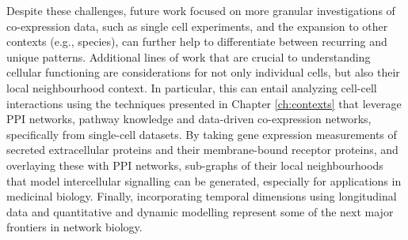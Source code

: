 Despite these challenges, future work focused on more granular investigations of co-expression data, such as single cell experiments, and the expansion to other contexts (e.g., species), can further help to differentiate between recurring and unique patterns. Additional lines of work that are crucial to understanding cellular functioning are considerations for not only individual cells, but also their local neighbourhood context. In particular, this can entail analyzing cell-cell interactions using the techniques presented in Chapter \ref{ch:contexts} that leverage PPI networks, pathway knowledge and data-driven co-expression networks, specifically from single-cell datasets. By taking gene expression measurements of secreted extracellular proteins and their membrane-bound receptor proteins, and overlaying these with PPI networks, sub-graphs of their local neighbourhoods that model intercellular signalling can be generated, especially for applications in medicinal biology. Finally, incorporating temporal dimensions using longitudinal data \parencite{bodein2022} and quantitative and dynamic modelling \parencite{villaverde2022} represent some of the next major frontiers in network biology.






